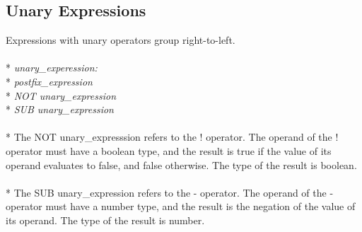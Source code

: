\subsection{Unary Expressions}
Expressions with unary operators group right-to-left.
\\ \\* \tab \emph{unary\_experession:}
\\* \tab \tab \emph{postfix\_expression}
\\* \tab \tab \emph{NOT unary\_expression}
\\* \tab \tab \emph{SUB unary\_expression}
\\ \\* The NOT unary\_expresssion refers to the ! operator. The operand of the ! operator must have a boolean type, and the result is true if the value of its operand evaluates to false, and false otherwise. The type of the result is boolean.
\\ \\* The SUB unary\_expression refers to the - operator. The operand of the - operator must have a number type, and the result is the negation of the value of its operand. The type of the result is number.

